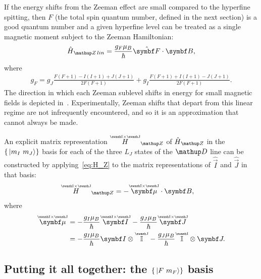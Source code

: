 If the energy shifts from the Zeeman effect are small compared to the hyperfine spitting, then $F$ (the total spin quantum number, defined in the next section) is a good quantum number and a given hyperfine level can be treated as a single magnetic moment subject to the Zeeman Hamiltonian:
\begin{align}
\hat H_\up{Z\,lin} = \frac{g_F\mu_B}{\hbar} \hat{\vec F} \cdot \vec B,
\end{align}
where~\cite{steck_rubidium_2015}
\begin{align}
g_F = g_J\frac{F(F+1) - I(I+1) + J(J+1)}{2F(F+1)}
    + g_I\frac{F(F+1) + I(I+1) - J(J+1)}{2F(F+1)}.
\end{align}
The direction in which each Zeeman sublevel shifts in energy for small magnetic fields is depicted in~. Experimentally, Zeeman shifts that depart from this linear regime are not infrequently encountered, and so it is an approximation that cannot always be made.

An explicit matrix representation $\oversetIJ{H}_\up{Z}$ of $\hat H_\up{Z}$ in the $\{\ket{m_I\ m_J}\}$ basis for each of the three $L_J$ states of the $\up{D}$ line can be constructed by applying~\eqref{eq:H_Z} to the matrix representations of $\hat{\vec I}$ and $\hat{\vec J}$ in that basis: 
\begin{align}\label{eq:Zeeman_hamiltonian}
\oversetIJ{H}_\up{Z} &= -\oversetIJ{\vec\mu}\cdot \vec B,
\end{align}
where
\begin{align}\label{eq:magnetic_moment_operator}
\oversetIJ{\vec\mu} &=
-\frac{g_I\mu_B}{\hbar} \oversetIJ{\vec I}
- \frac{g_J\mu_B}{\hbar} \oversetIJ{\vec J}\\
&= -\frac{g_I\mu_B}{\hbar} \vec I \otimes \oversetJ{\mathbb{I}}
- \frac{g_J\mu_B}{\hbar} \oversetI{\mathbb{I}} \otimes \vec J.
\end{align}

\subsection{Putting it all together: the $\{\ket{F\ m_F}\}$ basis}\label{sec:the_F_mF_basis}

